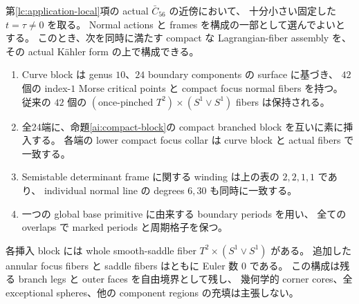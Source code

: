 \begin{theorem}
\label{ai:c56-allends}
第\ref{lc:application-local}項の actual $\bar C_{56}$ の近傍において、
十分小さい固定した $t=\tau\ne0$ を取る。
Normal actions と frames を構成の一部として選んでよいとする。
このとき、次を同時に満たす compact な Lagrangian-fiber assembly を、
その actual K\"ahler form の上で構成できる。
\begin{enumerate}
\item Curve block は genus $10$、$24$ boundary components の surface に基づき、
      $42$ 個の index-$1$ Morse critical points と compact focus normal fibers を持つ。
      従来の $42$ 個の $(\text{once-pinched }T^2)\times(S^1\vee S^1)$ fibers は保持される。
\item 全24端に、命題\ref{ai:compact-block}の compact branched block を互いに素に挿入する。
      各端の lower compact focus collar は curve block と actual fibers で一致する。
\item Semistable determinant frame に関する winding は上の表の $2,2,1,1$ であり、
      individual normal line の degrees $6,30$ も同時に一致する。
\item 一つの global base primitive に由来する boundary periods を用い、
      全ての overlaps で marked periods と周期格子を保つ。
\end{enumerate}
各挿入 block には whole smooth-saddle fiber $T^2\times(S^1\vee S^1)$ がある。
追加した annular focus fibers と saddle fibers はともに Euler 数 $0$ である。
この構成は残る branch legs と outer faces を自由境界として残し、
幾何学的 corner cores、全 exceptional spheres、他の component regions の充填は主張しない。
\end{theorem}

